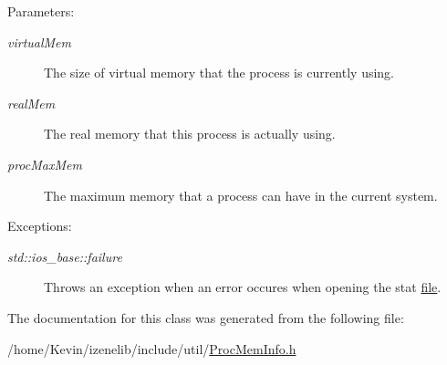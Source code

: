 \begin{Desc}
\item[Parameters:]
\begin{description}
\item[{\em virtualMem}]The size of virtual memory that the process is currently using. \item[{\em realMem}]The real memory that this process is actually using. \item[{\em procMaxMem}]The maximum memory that a process can have in the current system. \end{description}
\end{Desc}
\begin{Desc}
\item[Exceptions:]
\begin{description}
\item[{\em std::ios\_\-base::failure}]Throws an exception when an error occures when opening the stat \hyperlink{classfile}{file}. \end{description}
\end{Desc}


The documentation for this class was generated from the following file:\begin{CompactItemize}
\item 
/home/Kevin/izenelib/include/util/\hyperlink{ProcMemInfo_8h}{ProcMemInfo.h}\end{CompactItemize}
